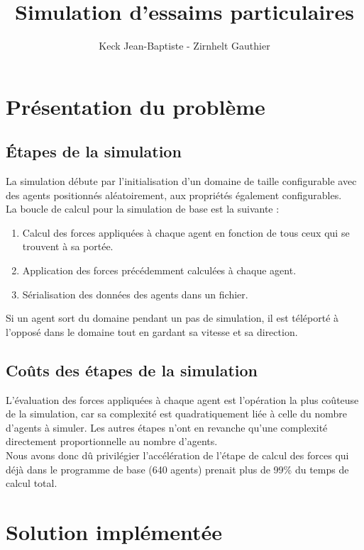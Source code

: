 \documentclass[12pt,a4paper,sans]{article}
\title{Simulation d'essaims particulaires}
\author{Keck Jean-Baptiste - Zirnhelt Gauthier}
\begin{document}
\maketitle



\section{Présentation du problème}

\subsection{Étapes de la simulation}
La simulation débute par l'initialisation d'un domaine de taille configurable avec des agents positionnés aléatoirement, aux propriétés également configurables.\\
La boucle de calcul pour la simulation de base est la suivante :
\begin{enumerate}
    \item Calcul des forces appliquées à chaque agent en fonction de tous ceux qui se trouvent à sa portée.
    \item Application des forces précédemment calculées à chaque agent.
    \item Sérialisation des données des agents dans un fichier.
\end{enumerate}
Si un agent sort du domaine pendant un pas de simulation, il est téléporté à l'opposé dans le domaine tout en gardant sa vitesse et sa direction.

\subsection{Coûts des étapes de la simulation}
L'évaluation des forces appliquées à chaque agent est l'opération la plus coûteuse de la simulation, car sa complexité est quadratiquement liée à celle du nombre d'agents à simuler. Les autres étapes n'ont en revanche qu'une complexité directement proportionnelle au nombre d'agents.\\
Nous avons donc dû privilégier l'accélération de l'étape de calcul des forces qui déjà dans le programme de base (640 agents) prenait plus de 99\% du temps de calcul total.



\newpage
\section{Solution implémentée}
\end{document}
